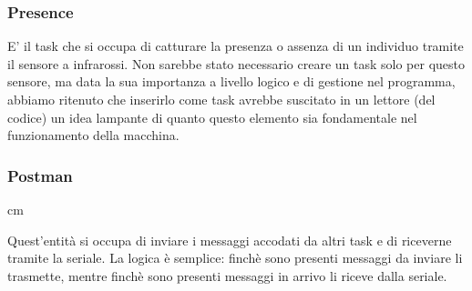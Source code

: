 \documentclass{article}
\begin{document}
\subsubsection{Presence}
E' il task che si occupa di catturare la presenza o assenza di un individuo tramite il sensore a infrarossi. Non sarebbe stato necessario creare un task solo per questo sensore, ma data la sua importanza a livello logico e di gestione nel programma, abbiamo ritenuto che inserirlo come task avrebbe suscitato in un lettore (del codice) un idea lampante di quanto questo elemento sia fondamentale nel funzionamento della macchina.

\subsubsection{Postman}
 cm
\begin{center}
\end{center}
Quest'entità si occupa di inviare i messaggi accodati da altri task e di riceverne tramite la seriale. La logica è semplice: finchè sono presenti messaggi da inviare li trasmette, mentre finchè sono presenti messaggi in arrivo li riceve dalla seriale.
\end{document}
